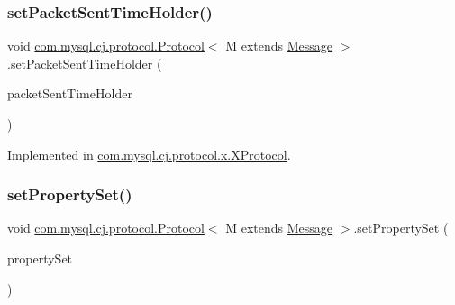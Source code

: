\subsubsection{\texorpdfstring{set\+Packet\+Sent\+Time\+Holder()}{setPacketSentTimeHolder()}}
{\footnotesize\ttfamily void \mbox{\hyperlink{interfacecom_1_1mysql_1_1cj_1_1protocol_1_1_protocol}{com.\+mysql.\+cj.\+protocol.\+Protocol}}$<$ M extends \mbox{\hyperlink{interfacecom_1_1mysql_1_1cj_1_1protocol_1_1_message}{Message}} $>$.set\+Packet\+Sent\+Time\+Holder (\begin{DoxyParamCaption}\item[{\mbox{\hyperlink{interfacecom_1_1mysql_1_1cj_1_1protocol_1_1_packet_sent_time_holder}{Packet\+Sent\+Time\+Holder}}}]{packet\+Sent\+Time\+Holder }\end{DoxyParamCaption})}



Implemented in \mbox{\hyperlink{classcom_1_1mysql_1_1cj_1_1protocol_1_1x_1_1_x_protocol_ad405a2fe2c30b3dcd9f8dcc1d866c7cf}{com.\+mysql.\+cj.\+protocol.\+x.\+X\+Protocol}}.

\mbox{\label{interfacecom_1_1mysql_1_1cj_1_1protocol_1_1_protocol_a870e0a7a79b5248e942b165fe1a9593c}} 
\subsubsection{\texorpdfstring{set\+Property\+Set()}{setPropertySet()}}
{\footnotesize\ttfamily void \mbox{\hyperlink{interfacecom_1_1mysql_1_1cj_1_1protocol_1_1_protocol}{com.\+mysql.\+cj.\+protocol.\+Protocol}}$<$ M extends \mbox{\hyperlink{interfacecom_1_1mysql_1_1cj_1_1protocol_1_1_message}{Message}} $>$.set\+Property\+Set (\begin{DoxyParamCaption}\item[{\mbox{\hyperlink{interfacecom_1_1mysql_1_1cj_1_1conf_1_1_property_set}{Property\+Set}}}]{property\+Set }\end{DoxyParamCaption})}

\mbox{\label{interfacecom_1_1mysql_1_1cj_1_1protocol_1_1_protocol_ace5604859b8b79df6dcf91bee7c1cc6c}} 
